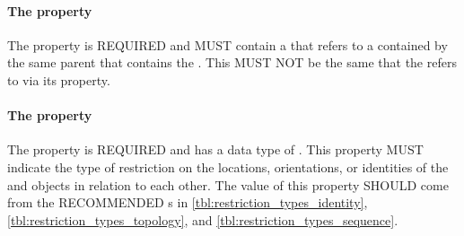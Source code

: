 \paragraph{The  property}\label{sec:object}
The  property is REQUIRED and MUST contain a  that refers to a  contained by the same parent  that contains the . This  MUST NOT be the same  that the  refers to via its  property.

\paragraph{The  property}\label{sec:restriction}

The  property is REQUIRED and has a data type of . 
This property MUST indicate the type of restriction on the locations, orientations, or identities of the  and   objects in relation to each other. 
The  value of this property SHOULD come from the RECOMMENDED s in \ref{tbl:restriction_types_identity}, \ref{tbl:restriction_types_topology}, and \ref{tbl:restriction_types_sequence}.

